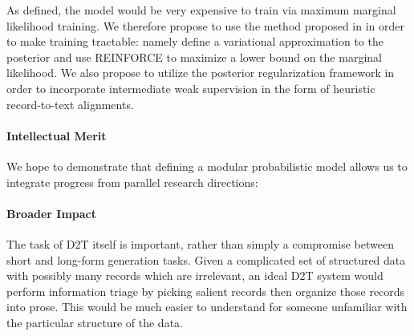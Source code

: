 \documentclass[11pt]{article}
\begin{document}
As defined, the model would be very expensive to train via maximum marginal likelihood
training. We therefore propose to use the method proposed in \citep{deng2018vattn}
in order to make training tractable: namely define a variational approximation to the
posterior and use REINFORCE to maximize a lower bound on the marginal likelihood.
We also propose to utilize the posterior regularization framework in order to incorporate 
intermediate weak supervision in the form of heuristic record-to-text alignments.

% 
\paragraph{Intellectual Merit}
We hope to demonstrate that defining a modular probabilistic model allows us
to integrate progress from parallel research directions:

\paragraph{Broader Impact}
The task of D2T itself is important, rather than simply a compromise between
short and long-form generation tasks.
Given a complicated set of structured data with possibly many records
which are irrelevant, an ideal D2T system would perform information triage by 
picking salient records then organize those records into prose.
This would be much easier to understand for someone unfamiliar with the
particular structure of the data.




\end{document}
